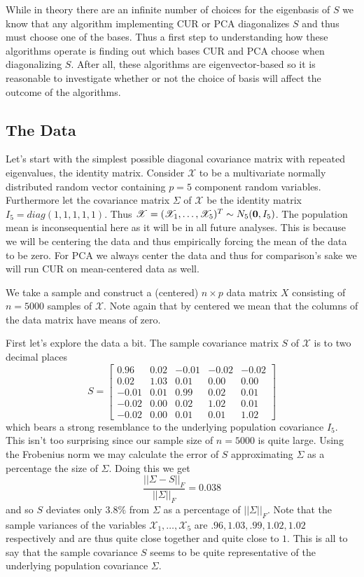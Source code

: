 \documentclass{book}
\newcommand{\bs}[1]{\boldsymbol{#1}}
\newcommand{\rv}[1]{\bs{\mathscr{#1}}}
\begin{document}
While in theory there are an infinite number of choices for the eigenbasis of $S$ we know that any algorithm implementing CUR or PCA diagonalizes $S$ and thus must choose one of the bases. Thus a first step to understanding how these algorithms operate is finding out which bases CUR and PCA choose when diagonalizing $S$. After all, these algorithms are eigenvector-based so it is reasonable to investigate whether or not the choice of basis will affect the outcome of the algorithms.


\subsection{The Data}

Let's start with the simplest possible diagonal covariance matrix with repeated eigenvalues, the identity matrix. Consider $\rv{X}$ to be a multivariate normally distributed random vector containing $p=5$ component random variables. Furthermore let the covariance matrix $\Sigma$ of $\rv{X}$ be the identity matrix $I_5=diag(1,1,1,1,1)$. Thus $\rv{X}=(\mathscr{X}_1,\ldots,\mathscr{X}_5)^T\sim N_5({\bf 0},I_5)$. The population mean is inconsequential here as it will be in all future analyses. This is because we will be centering the data and thus empirically forcing the mean of the data to be zero. For PCA we always center the data and thus for comparison's sake we will run CUR on mean-centered data as well.

We take a sample and construct a (centered) $n\times p$ data matrix $X$ consisting of $n=5000$ samples of $\rv{X}$. Note again that by centered we mean that the columns of the data matrix have means of zero. 

First let's explore the data a bit. The sample covariance matrix $S$ of $\rv{X}$ is to two decimal places
$$
S=\begin{bmatrix}
0.96& 0.02& -0.01& -0.02& -0.02\\
0.02& 1.03&  0.01&  0.00&  0.00\\
-0.01& 0.01&  0.99&  0.02&  0.01\\
-0.02& 0.00&  0.02&  1.02&  0.01\\
-0.02& 0.00&  0.01&  0.01&  1.02
\end{bmatrix}
$$
which bears a strong resemblance to the underlying population covariance $I_5$. This isn't too surprising since our sample size of $n=5000$ is quite large. Using the Frobenius norm we may calculate the error of $S$ approximating $\Sigma$ as a percentage the size of $\Sigma$. Doing this we get 
$$
\frac{||\Sigma-S||_F}{||\Sigma||_F}=0.038
$$
and so $S$ deviates only $3.8\%$ from $\Sigma$ as a percentage of $||\Sigma||_F$. Note that the sample variances of the variables $\mathscr{X}_1,\ldots,\mathscr{X}_5$ are $.96,1.03,.99,1.02,1.02$  respectively and are thus quite close together and quite close to $1$. This is all to say that the sample covariance $S$ seems to be quite representative of the underlying population covariance $\Sigma$. 
\end{document}
